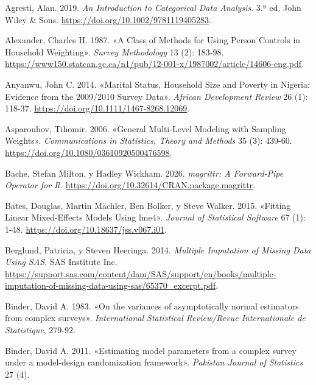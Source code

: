\documentclass[
  spanish,
  11pt,
  letterpaper,
  oneside,
  open=any]{scrbook}
\newlength{\cslhangindent}
\newenvironment{CSLReferences}[2] %
 {\begin{list}{}{%
  \setlength{\itemindent}{0pt}
  \setlength{\leftmargin}{0pt}
  \setlength{\parsep}{0pt}
  \ifodd #1
   \setlength{\leftmargin}{\cslhangindent}
   \setlength{\itemindent}{-1\cslhangindent}
  \fi
  \setlength{\itemsep}{#2\baselineskip}}}
 {\end{list}}
\begin{document}
\protect{}\label{refs}
\begin{CSLReferences}{1}{1}
Agresti, Alan. 2019. \emph{An Introduction to Categorical Data
Analysis}. 3.ª ed. John Wiley \& Sons.
\url{https://doi.org/10.1002/9781119405283}.

Alexander, Charles H. 1987. {«A Class of Methods for Using Person
Controls in Household Weighting»}. \emph{Survey Methodology} 13 (2):
183-98.
\url{https://www150.statcan.gc.ca/n1/pub/12-001-x/1987002/article/14606-eng.pdf}.

Anyanwu, John C. 2014. {«Marital Status, Household Size and Poverty in
{Nigeria}: Evidence from the 2009/2010 Survey Data»}. \emph{African
Development Review} 26 (1): 118-37.
\url{https://doi.org/10.1111/1467-8268.12069}.

Asparouhov, Tihomir. 2006. {«General Multi-Level Modeling with Sampling
Weights»}. \emph{Communications in Statistics, Theory and Methods} 35
(3): 439-60. \url{https://doi.org/10.1080/03610920500476598}.

Bache, Stefan Milton, y Hadley Wickham. 2026. \emph{magrittr: A
Forward-Pipe Operator for R}.
\url{https://doi.org/10.32614/CRAN.package.magrittr}.

Bates, Douglas, Martin Mächler, Ben Bolker, y Steve Walker. 2015.
{«Fitting Linear Mixed-Effects Models Using lme4»}. \emph{Journal of
Statistical Software} 67 (1): 1-48.
\url{https://doi.org/10.18637/jss.v067.i01}.

Berglund, Patricia, y Steven Heeringa. 2014. \emph{Multiple Imputation
of Missing Data Using {SAS}}. SAS Institute Inc.
\url{https://support.sas.com/content/dam/SAS/support/en/books/multiple-imputation-of-missing-data-using-sas/65370_excerpt.pdf}.

Binder, David A. 1983. {«On the variances of asymptotically normal
estimators from complex surveys»}. \emph{International Statistical
Review/Revue Internationale de Statistique}, 279-92.

Binder, David A. 2011. {«Estimating model parameters from a complex
survey under a model-design randomization framework»}. \emph{Pakistan
Journal of Statistics} 27 (4).


\end{CSLReferences}
\end{document}
